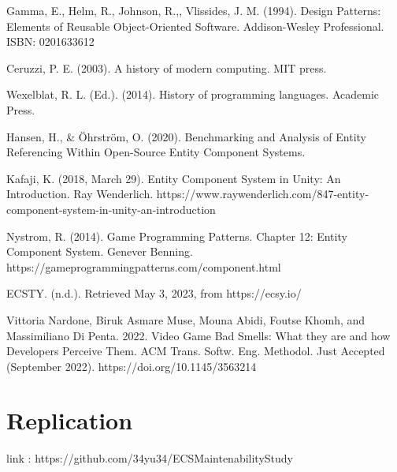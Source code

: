 \documentclass{IEEEcsmag}
\begin{document}
\def\refname{REFERENCES}

\begin{thebibliography}{1}

Gamma, E., Helm, R., Johnson, R.,, Vlissides, J. M. (1994). Design Patterns: Elements of Reusable Object-Oriented Software. Addison-Wesley Professional. ISBN: 0201633612

Ceruzzi, P. E. (2003). A history of modern computing. MIT press.

Wexelblat, R. L. (Ed.). (2014). History of programming languages. Academic Press.

Hansen, H., \& Öhrström, O. (2020). Benchmarking and Analysis of Entity Referencing Within Open-Source Entity Component Systems.

Kafaji, K. (2018, March 29). Entity Component System in Unity: An Introduction. Ray Wenderlich. https://www.raywenderlich.com/847-entity-component-system-in-unity-an-introduction

Nystrom, R. (2014). Game Programming Patterns. Chapter 12: Entity Component System. Genever Benning. https://gameprogrammingpatterns.com/component.html

ECSTY. (n.d.). Retrieved May 3, 2023, from https://ecsy.io/

Vittoria Nardone, Biruk Asmare Muse, Mouna Abidi, Foutse Khomh, and Massimiliano Di Penta. 2022. Video Game Bad Smells: What they are and how Developers Perceive Them. ACM Trans. Softw. Eng. Methodol. Just Accepted (September 2022). https://doi.org/10.1145/3563214

\end{thebibliography}

\section{Replication}

link : https://github.com/34yu34/ECSMaintenabilityStudy
\end{document}
